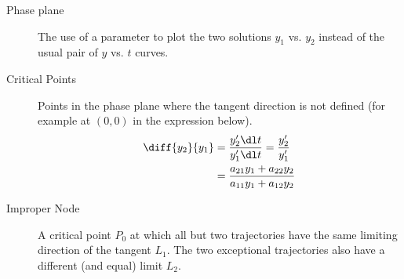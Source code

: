 \begin{description}
    \item[Phase plane] The use of a parameter to plot the two solutions $ y_1 $ vs.
        $y_2$ instead of the usual pair of $ y $ vs. $ t $ curves.
    \item[Critical Points] Points in the phase plane where the tangent direction is
        not defined (for example at $ (0, 0) $ in the expression below).
        \begin{align}
            \diff{y_2}{y_1} & = \frac{y_2' \dl t}{y_1' \dl t} = \frac{y_2'}{y_1'}   \\
                            & = \frac{a_{21}y_1 + a_{22}y_2}{a_{11}y_1 + a_{12}y_2}
        \end{align}
    \item[Improper Node] A critical point $ P_0 $ at which all but two trajectories
        have the same limiting direction of the tangent $ L_1 $. The two exceptional
        trajectories also have a different (and equal) limit $ L_2 $.


\end{description}
